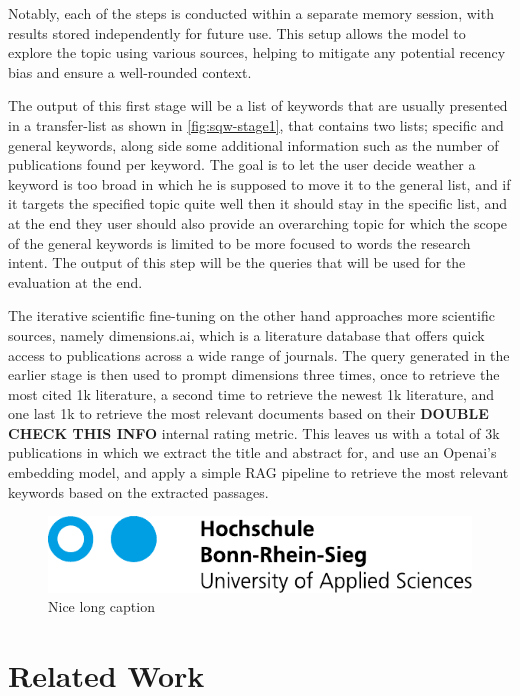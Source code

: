 Notably, each of the steps is conducted within a separate memory session, with results stored independently for future use. This setup allows the model to explore the topic using various sources, helping to mitigate any potential recency bias and ensure a well-rounded context.

The output of this first stage will be a list of keywords that are usually presented in a transfer-list as shown in \autoref{fig:sqw-stage1}, that contains two lists; specific and general keywords, along side some additional information such as the number of publications found per keyword. The goal is to let the user decide weather a keyword is too broad in which he is supposed to move it to the general list, and if it targets the specified topic quite well then it should stay in the specific list, and at the end they user should also provide an overarching topic for which the scope of the general keywords is limited to be more focused to words the research intent. The output of this step will be the queries that will be used for the evaluation at the end.

The iterative scientific fine-tuning on the other hand approaches more scientific sources, namely dimensions.ai, which is a literature database that offers quick access to publications across a wide range of journals. The query generated in the earlier stage is then used to prompt dimensions three times, once to retrieve the most cited 1k literature, a second time to retrieve the newest 1k literature, and one last 1k to retrieve the most relevant documents based on their \textbf{DOUBLE CHECK THIS INFO} internal rating metric. This leaves us with a total of 3k publications in which we extract the title and abstract for, and use an Openai's embedding model, and apply a simple RAG pipeline to retrieve the most relevant keywords based on the extracted passages.


\begin{figure}
	\centering
	\includegraphics{FrontBackmatter/H-BRS_Logo_A4}
	\caption[Nice short caption]{Nice long caption}
	\label{fig:sqw-stage1}
\end{figure}

\section{Related Work}\label{sec:relwork}
